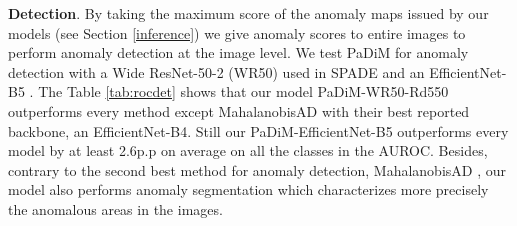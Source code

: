 \documentclass[a4paper,conference]{IEEEtran}
\begin{document}
\textbf{Detection}. By taking the maximum score of the anomaly maps issued by our models (see Section  \ref{inference}) we give anomaly scores to entire images to perform anomaly detection at the image level. We test PaDiM for anomaly detection with a Wide ResNet-50-2 (WR50) \cite{wdr50} used in SPADE and an EfficientNet-B5 \cite{efficientnet}. The Table \ref{tab:rocdet} shows that our model PaDiM-WR50-Rd550 outperforms every method except MahalanobisAD \cite{rippel2020modeling} with their best reported backbone, an EfficientNet-B4. Still our PaDiM-EfficientNet-B5 outperforms every model by at least 2.6p.p on average on all the classes in the AUROC. Besides, contrary to the second best method for anomaly detection, MahalanobisAD \cite{rippel2020modeling}, our model also performs anomaly segmentation which characterizes more precisely the anomalous areas in the images.

\label{Comparison with the state-of-the-art}
\end{document}
